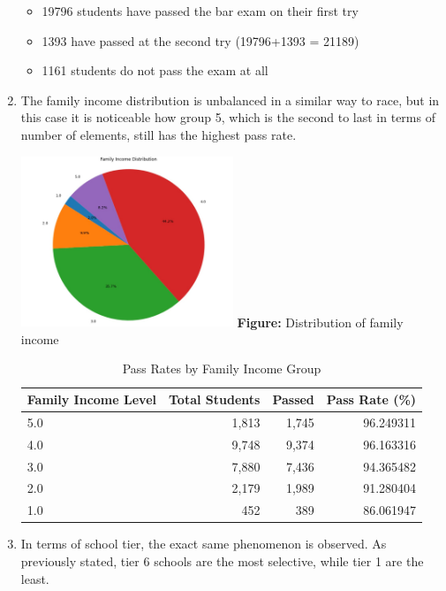 \documentclass{article}
\begin{document}
\begin{enumerate}
    \begin{itemize}
        \item 19796 students have passed the bar exam on their first try
        \item 1393 have passed at the second try (19796+1393 = 21189)
        \item 1161 students do not pass the exam at all
    \end{itemize}
    \item The family income distribution is unbalanced in a similar way to race, but in this case it is noticeable how group 5, which is the second to last in terms of number of elements, still has the highest pass rate. 
    \noindent
    \begin{center}
      \includegraphics[width=0.5\textwidth]{family_income_distribution.png}
      \vspace{0.5em}
      \textbf{Figure:} Distribution of family income
    \end{center}
    \begin{table}[h!]
    \centering
    \caption{Pass Rates by Family Income Group}
    \begin{tabular}{lrrr}
    \toprule
    Family Income Level & Total Students & Passed & Pass Rate (\%) \\
    \midrule
    5.0 & 1,813 & 1,745 & 96.249311 \\
    4.0 & 9,748 & 9,374 & 96.163316 \\
    3.0 & 7,880 & 7,436 & 94.365482 \\
    2.0 & 2,179 & 1,989 & 91.280404 \\
    1.0 & 452   & 389   & 86.061947 \\
    \bottomrule
    \end{tabular}
    \label{tab:pass_rates_income}
    \end{table}
    \item In terms of school tier, the exact same phenomenon is observed. As previously stated, tier 6 schools are the most selective, while tier 1 are the least. 

\end{enumerate}
\end{document}

